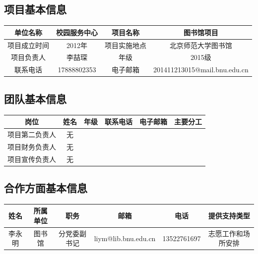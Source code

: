 \documentclass[nocover]{lizhechen}
\begin{document}
	\subsection{项目基本信息}
	
	\begin{table}[H]
		\begin{center}
		\begin{tabular}{|c|c|c|c|}
			\hline
			单位名称 & 校园服务中心 & 项目名称 &  图书馆项目 \\
			\hline
			项目成立时间 & 2012年 & 项目实施地点 & 北京师范大学图书馆 \\
			\hline
			项目负责人 & 李喆琛 & 年级 & 2015级 \\
			\hline
			联系电话 & 17888802353 & 电子邮箱 & 201411213015@mail.bnu.edu.cn \\
			\hline
		\end{tabular}
		\end{center}
	\end{table}
	
	\subsection{团队基本信息}
	
	\begin{table}[H]
		\begin{center}
			\begin{tabular}{|c|c|c|c|c|c|}
				\hline
				岗位 & 姓名 & 年级 & 联系电话 & 电子邮箱 & 主要分工\\
				\hline
				项目第二负责人 & 无 & \ & \ & \ & \ \\
				\hline
				项目财务负责人 & 无 & \ & \ & \ & \ \\
				\hline
				项目宣传负责人 & 无 & \ & \ & \ & \ \\
				\hline
				
			\end{tabular}
		\end{center}
	\end{table}
	
	\subsection{合作方面基本信息}
	\begin{table}[H]
		\begin{center}
			\begin{tabular}{|c|c|c|c|c|c|}
				\hline
				姓名 & 所属单位 & 职务 & 邮箱 & 电话 & 提供支持类型 \\
				\hline
				李永明 & 图书馆 & 分党委副书记 & liym@lib.bnu.edu.cn & 13522761697 & 志愿工作和场所安排 \\
				\hline
			\end{tabular}
		\end{center}
	\end{table}
	
\end{document}
